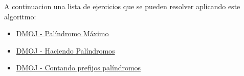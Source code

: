 A continuacion una lista de ejercicios que se pueden resolver aplicando este algoritmo:

\begin{itemize}
	\item \href{https://dmoj.uclv.edu.cu/problem/maxpalind}{DMOJ - Palíndromo Máximo}
	\item \href{https://dmoj.uclv.edu.cu/problem/mpalindrome}{DMOJ - Haciendo Palíndromos}
	\item \href{https://dmoj.uclv.edu.cu/problem/cpp}{DMOJ - Contando prefijos palíndromos}
\end{itemize}